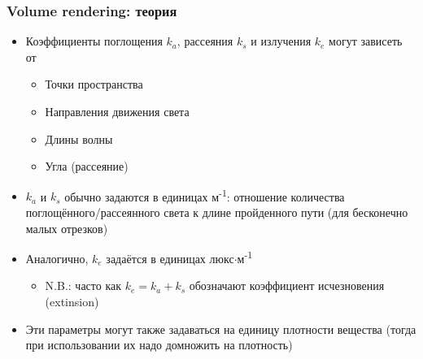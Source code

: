 \documentclass{beamer}
\begin{document}
\begin{frame}[fragile]
\frametitle{Volume rendering: теория}
\begin{itemize}
\item Коэффициенты поглощения \begin{math}k_a\end{math}, рассеяния \begin{math}k_s\end{math} и излучения \begin{math}k_e\end{math} могут зависеть от
\pause
\begin{itemize}
\item Точки пространства
\pause
\item Направления движения света
\pause
\item Длины волны
\pause
\item Угла (рассеяние)
\end{itemize}
\pause
\item \begin{math}k_a\end{math} и \begin{math}k_s\end{math} обычно задаются в единицах м\textsuperscript{-1}: отношение количества поглощённого/рассеянного света к длине пройденного пути (для бесконечно малых отрезков)
\pause
\item Аналогично, \begin{math}k_e\end{math} задаётся в единицах люкс\begin{math}\cdot\end{math}м\textsuperscript{-1}
\pause
\begin{itemize}
\item N.B.: часто как \begin{math}k_e = k_a + k_s\end{math} обозначают коэффициент исчезновения (extinsion)
\end{itemize}
\pause
\item Эти параметры могут также задаваться на единицу плотности вещества (тогда при использовании их надо домножить на плотность)
\end{itemize}
\end{frame}
\end{document}
